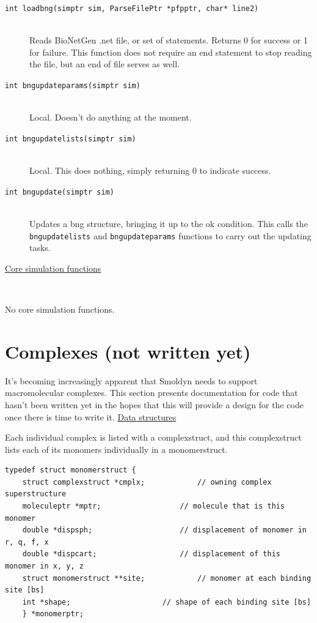 \documentclass {scrbook}
\newcommand {\ttt} {\texttt}
\begin{document}
\begin{description}
\item[\ttt{int loadbng(simptr sim, ParseFilePtr *pfpptr, char* line2)}]
\hfill \\
Reads BioNetGen .net file, or set of statements. Returns 0 for success or 1 for failure. This function does not require an end statement to stop reading the file, but an end of file serves as well.

\item[\ttt{int bngupdateparams(simptr sim)}]
\hfill \\
Local. Doesn't do anything at the moment.

\item[\ttt{int bngupdatelists(simptr sim)}]
\hfill \\
Local. This does nothing, simply returning 0 to indicate success.

\item[\ttt{int bngupdate(simptr sim)}]
\hfill \\
Updates a bng structure, bringing it up to the ok condition. This calls the \ttt{bngupdatelists} and \ttt{bngupdateparams} functions to carry out the updating tasks.

\item[\underline{Core simulation functions}]
\hfill \\

\item[No core simulation functions.]

\end{description}

\section{Complexes (not written yet)}

It's becoming increasingly apparent that Smoldyn needs to support macromolecular complexes. This section presents documentation for code that hasn't been written yet in the hopes that this will provide a design for the code once there is time to write it.
\newline
\newline
\underline{Data structures}

Each individual complex is listed with a complexstruct, and this complexstruct lists each of its monomers individually in a monomerstruct.

\begin{lstlisting}
typedef struct monomerstruct {
	struct complexstruct *cmplx;			// owning complex superstructure
	moleculeptr *mptr;					// molecule that is this monomer
	double *dispsph;					// displacement of monomer in r, q, f, x
	double *dispcart;					// displacement of this monomer in x, y, z
	struct monomerstruct **site;			// monomer at each binding site [bs]
	int *shape;						// shape of each binding site [bs]
	} *monomerptr;
\end{lstlisting}
\end{document}
